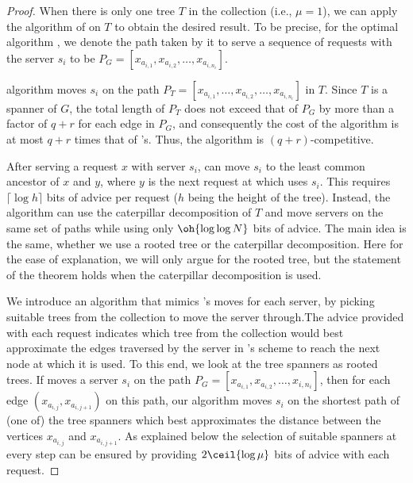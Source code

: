 \begin{proof} 
When there is only one tree $T$ in the collection (i.e., $\mu = 1$), we can apply the \pc algorithm of \cite{WAOA11} on $T$ to obtain the desired result. To be precise, 
for the optimal algorithm \opt, we denote the path taken by it to serve a sequence of requests with the server $s_i$ to be $P_G= \left[  x_{a_{i,1}},x_{a_{i,2}}, \ldots, 
x_{a_{i,n_i}} \right]$.



\pc algorithm moves $s_i$ on the path $P_T = \left[ x_{a_{i,1}}, \ldots,x_{a_{i,2}}, \ldots, x_{a_{i,n_i}} \right]$ in $T$. Since 
$T$ is a spanner of $G$, the total length of $P_T$ does not exceed that of $P_G$ by more than a factor of $q+r$ for each edge in $P_G$, and consequently the cost of 
the algorithm is at most $q+r$ times that of {\opt}'s. Thus, the algorithm is $(q+r)$-competitive. 

After serving a request $x$ with server $s_i$, \pc can move $s_i$ to the least common ancestor of $x$ and $y$, where $y$ is the next request at which \opt uses $s_{i}$. This 
requires $\lceil \log h \rceil$ bits of advice per request ($h$ being the height of the tree). Instead, the algorithm can use the caterpillar decomposition of $T$ 
and move servers on the same set of paths while using only $\oh{\log\log N}$ bits of advice. The main idea is the same, whether we use a rooted tree or the caterpillar decomposition. Here for the ease of explanation, we will only argue for the rooted tree, but the 
statement of the theorem holds when the caterpillar decomposition is used. 

We introduce an algorithm that mimics  \opt's moves for each server,  by picking suitable trees from the collection to move the server through.The advice provided with each request indicates which tree from the collection would best approximate the 
edges traversed by the server in \OPT's scheme to reach the next node at which it is used. To this end, we look at the tree spanners as rooted trees. If \opt moves a server $s_i$ on the path $P_G = \left[  x_{a_{i,1}},x_{a_{i,2}}, \ldots, x{_{i,n_i}} \right]$, then for each edge $(x_{a_{i,j}},x_{a_{i,j+1}})$ on this path, our algorithm moves $s_i$ on the shortest path of (one of) the tree spanners which best 
approximates the distance between the vertices $x_{a_{i,j}}$ and $x_{a_{i,j+1}}$.  As explained below the selection of suitable spanners at every step can be ensured by providing $2\ceil{\log \mu}$ bits of advice with each request.


\end{proof}
